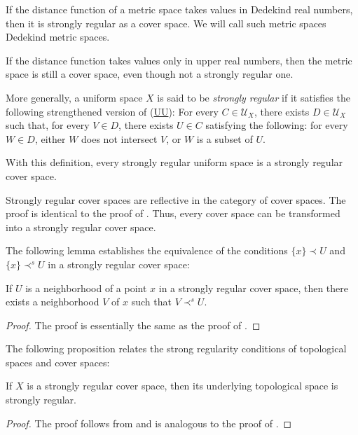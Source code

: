 \documentclass[reqno]{amsart}
\newcommand{\axref}[1]{(\hyperref[ax:#1]{#1})}
\theoremstyle{definition}
\theoremstyle{remark}
\numberwithin{figure}{section}
\newcommand{\rb}{\prec}
\begin{document}
\begin{example}
If the distance function of a metric space takes values in Dedekind real numbers, then it is strongly regular as a cover space.
We will call such metric spaces {Dedekind metric spaces}.

If the distance function takes values only in upper real numbers, then the metric space is still a cover space, even though not a strongly regular one.
\end{example}

\begin{example}
More generally, a uniform space $X$ is said to be \emph{strongly regular} if it satisfies the following strengthened version of \axref{UU}:
For every $C \in \mathcal{U}_X$, there exists $D \in \mathcal{U}_X$ such that, for every $V \in D$,
there exists $U \in C$ satisfying the following: for every $W \in D$, either $W$ does not intersect $V$, or $W$ is a subset of $U$.

With this definition, every strongly regular uniform space is a strongly regular cover space.
\end{example}

\begin{example}
Strongly regular cover spaces are reflective in the category of cover spaces.
The proof is identical to the proof of .
Thus, every cover space can be transformed into a strongly regular cover space.
\end{example}

The following lemma establishes the equivalence of the conditions $\{ x \} \rb U$ and $\{ x \} \rb^s U$ in a strongly regular cover space:

\begin{lem}
If $U$ is a neighborhood of a point $x$ in a strongly regular cover space, then there exists a neighborhood $V$ of $x$ such that $V \rb^s U$.
\end{lem}
\begin{proof}
The proof is essentially the same as the proof of .
\end{proof}

The following proposition relates the strong regularity conditions of topological spaces and cover spaces:

\begin{prop}
If $X$ is a strongly regular cover space, then its underlying topological space is strongly regular.
\end{prop}
\begin{proof}
The proof follows from  and is analogous to the proof of .
\end{proof}
\end{document}
